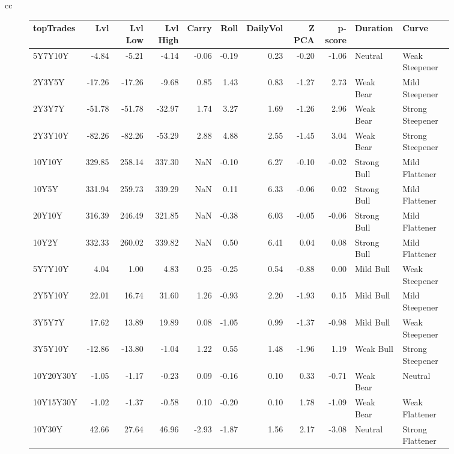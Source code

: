\documentclass[a4paper,oneside]{report}
\begin{document}
\begin{figure}[htbp]
\begin{tabular}[c]{cc}
\begin{subfigure}[c]{0.5\textwidth}
\begin{adjustbox}{max width=\textwidth}
\begin{tabular}{lrrrrrrrrll}
\hline
 topTrades &     Lvl &  Lvl Low &  Lvl High &  Carry &  Roll &  DailyVol &  Z PCA &  p-score &     Duration &             Curve \\
\hline
   5Y7Y10Y &   -4.84 &    -5.21 &     -4.14 &  -0.06 & -0.19 &      0.23 &  -0.20 &    -1.06 &      Neutral &    Weak Steepener \\
   2Y3Y5Y &  -17.26 &   -17.26 &     -9.68 &   0.85 &  1.43 &      0.83 &  -1.27 &     2.73 &    Weak Bear &    Mild Steepener \\
   2Y3Y7Y &  -51.78 &   -51.78 &    -32.97 &   1.74 &  3.27 &      1.69 &  -1.26 &     2.96 &    Weak Bear &  Strong Steepener \\
   2Y3Y10Y &  -82.26 &   -82.26 &    -53.29 &   2.88 &  4.88 &      2.55 &  -1.45 &     3.04 &    Weak Bear &  Strong Steepener \\
   10Y10Y &  329.85 &   258.14 &    337.30 &    NaN & -0.10 &      6.27 &  -0.10 &    -0.02 &  Strong Bull &    Mild Flattener \\
   10Y5Y &  331.94 &   259.73 &    339.29 &    NaN &  0.11 &      6.33 &  -0.06 &     0.02 &  Strong Bull &    Mild Flattener \\
   20Y10Y &  316.39 &   246.49 &    321.85 &    NaN & -0.38 &      6.03 &  -0.05 &    -0.06 &  Strong Bull &    Mild Flattener \\
   10Y2Y &  332.33 &   260.02 &    339.82 &    NaN &  0.50 &      6.41 &   0.04 &     0.08 &  Strong Bull &    Mild Flattener \\
   5Y7Y10Y &    4.04 &     1.00 &      4.83 &   0.25 & -0.25 &      0.54 &  -0.88 &     0.00 &    Mild Bull &    Weak Steepener \\
   2Y5Y10Y &   22.01 &    16.74 &     31.60 &   1.26 & -0.93 &      2.20 &  -1.93 &     0.15 &    Mild Bull &    Mild Steepener \\
   3Y5Y7Y &   17.62 &    13.89 &     19.89 &   0.08 & -1.05 &      0.99 &  -1.37 &    -0.98 &    Mild Bull &    Weak Steepener \\
   3Y5Y10Y &  -12.86 &   -13.80 &     -1.04 &   1.22 &  0.55 &      1.48 &  -1.96 &     1.19 &    Weak Bull &  Strong Steepener \\
   10Y20Y30Y &   -1.05 &    -1.17 &     -0.23 &   0.09 & -0.16 &      0.10 &   0.33 &    -0.71 &    Weak Bear &           Neutral \\
   10Y15Y30Y &   -1.02 &    -1.37 &     -0.58 &   0.10 & -0.20 &      0.10 &   1.78 &    -1.09 &    Weak Bear &    Weak Flattener \\
   10Y30Y &   42.66 &    27.64 &     46.96 &  -2.93 & -1.87 &      1.56 &   2.17 &    -3.08 &      Neutral &  Strong Flattener \\
\hline
\end{tabular}
\end{adjustbox}
\end{subfigure}\\
 

\end{tabular}
\end{figure}
\end{document}

